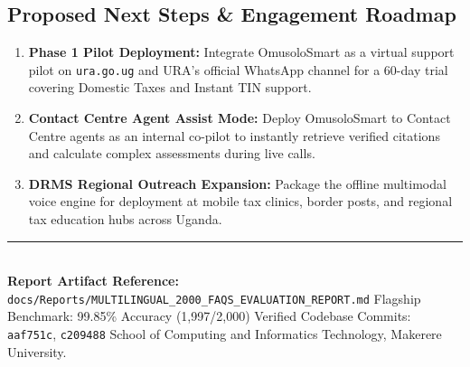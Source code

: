 \documentclass[10pt,a4paper]{article}
\begin{document}
\subsection{Proposed Next Steps \& Engagement Roadmap}
\begin{enumerate}
  \item \textbf{Phase 1 Pilot Deployment:} Integrate OmusoloSmart as a virtual support pilot on \texttt{ura.go.ug} and URA's official WhatsApp channel for a 60-day trial covering Domestic Taxes and Instant TIN support.
  \item \textbf{Contact Centre Agent Assist Mode:} Deploy OmusoloSmart to Contact Centre agents as an internal co-pilot to instantly retrieve verified citations and calculate complex assessments during live calls.
  \item \textbf{DRMS Regional Outreach Expansion:} Package the offline multimodal voice engine for deployment at mobile tax clinics, border posts, and regional tax education hubs across Uganda.
\end{enumerate}

\vspace{4mm}
\rule{\textwidth}{0.4pt}\\
{\footnotesize \textbf{Report Artifact Reference:} \texttt{docs/Reports/MULTILINGUAL\_2000\_FAQS\_EVALUATION\_REPORT.md} \textbullet{} Flagship Benchmark: 99.85\% Accuracy (1,997/2,000) \textbullet{} Verified Codebase Commits: \texttt{aaf751c}, \texttt{c209488} \textbullet{} School of Computing and Informatics Technology, Makerere University.}
\end{document}
